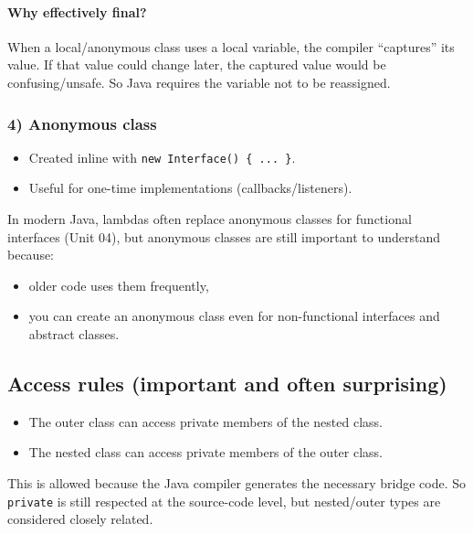 \documentclass[11pt]{article}
\begin{document}
\paragraph{Why effectively final?}
When a local/anonymous class uses a local variable, the compiler ``captures'' its value.
If that value could change later, the captured value would be confusing/unsafe.
So Java requires the variable not to be reassigned.

\subsubsection{4) Anonymous class}
\begin{itemize}
  \item Created inline with \texttt{new Interface() \{ ... \}}.
  \item Useful for one-time implementations (callbacks/listeners).
\end{itemize}
In modern Java, lambdas often replace anonymous classes for functional interfaces (Unit 04), but anonymous classes are still important to understand because:
\begin{itemize}
  \item older code uses them frequently,
  \item you can create an anonymous class even for non-functional interfaces and abstract classes.
\end{itemize}
\notesources{\OOPSUnitIIISources}

\subsection{Access rules (important and often surprising)}
\begin{itemize}
  \item The outer class can access private members of the nested class.
  \item The nested class can access private members of the outer class.
\end{itemize}
This is allowed because the Java compiler generates the necessary bridge code.
So \texttt{private} is still respected at the source-code level, but nested/outer types are considered closely related.
\end{document}
